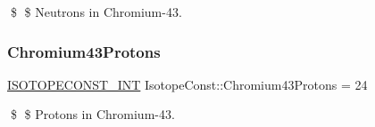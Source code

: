 \$ \$ Neutrons in Chromium-\/43. \mbox{\label{group___isotope_const-_chromium-_cr43_ga7991942c32452deb1123d2be33314166}} 
\subsubsection{\texorpdfstring{Chromium43\+Protons}{Chromium43Protons}}
{\footnotesize\ttfamily \mbox{\hyperlink{group___isotope_const-_macros_ga5f18360b3e99483a35c32d789e62621c}{I\+S\+O\+T\+O\+P\+E\+C\+O\+N\+S\+T\+\_\+\+I\+NT}} Isotope\+Const\+::\+Chromium43\+Protons = 24}

\$ \$ Protons in Chromium-\/43. 
